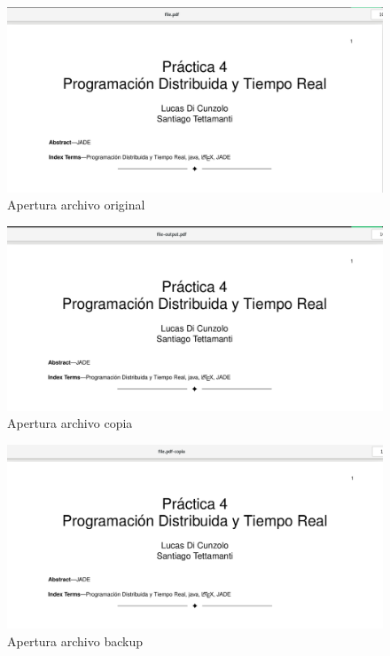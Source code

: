 \documentclass[12pt,journal,compsoc]{IEEEtran}
\begin{document}
\begin{figure}[H]
  \centering
  \includegraphics[width=160mm]{images/punto-3/readwrite/8-open-original.png}
  \caption{Apertura archivo original}
  \label{fig:open-original}
\end{figure}

\begin{figure}[H]
  \centering
  \includegraphics[width=160mm]{images/punto-3/readwrite/9-open-copy.png}
  \caption{Apertura archivo copia}
  \label{fig:open-copy}
\end{figure}

\begin{figure}[H]
  \centering
  \includegraphics[width=160mm]{images/punto-3/readwrite/10-open-backup.png}
  \caption{Apertura archivo backup}
  \label{fig:open-backup}
\end{figure}

\ifCLASSOPTIONcaptionsoff
  \newpage
\fi
\end{document}
